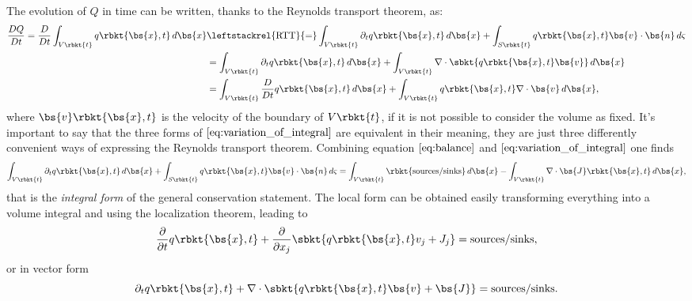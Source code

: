The evolution of $Q$ in time can be written, thanks to the Reynolds transport theorem, as:
\begin{subequations}\label{eq:variation_of_integral}
    \begin{align}
        \dfrac{DQ}{Dt} = \dfrac{D}{Dt}\int_{V\rbkt{t}}q\rbkt{\bs{x},t}\,d\bs{x} 
        &\leftstackrel{\text{RTT}}{=} \int_{V\rbkt{t}} \partial_{t}q\rbkt{\bs{x},t}\,d\bs{x} + \int_{S\rbkt{t}} q\rbkt{\bs{x},t}\bs{v}\cdot\bs{n} \,d\varsigma\\
        & = \int_{V\rbkt{t}} \partial_{t}q\rbkt{\bs{x},t}\,d\bs{x} + \int_{V\rbkt{t}} \nabla\cdot\sbkt{q\rbkt{\bs{x},t}\bs{v}}\,d\bs{x}\\
        & = \int_{V\rbkt{t}} \dfrac{D}{Dt}q\rbkt{\bs{x},t}\,d\bs{x} + \int_{V\rbkt{t}} q\rbkt{\bs{x},t}\nabla\cdot\bs{v}\,d\bs{x},
    \end{align}
\end{subequations}
where $\bs{v}\rbkt{\bs{x},t}$ is the velocity of the boundary of $V\rbkt{t}$, if it is not possible to consider the volume as fixed. It's important to say that the three forms of $\eqref{eq:variation_of_integral}$ are equivalent in their meaning, they are just three differently convenient ways of expressing the Reynolds transport theorem. Combining equation $\eqref{eq:balance}$ and $\eqref{eq:variation_of_integral}$ one finds
\begin{equation}\label{eq:integral_conservation_statement}
    \int_{V\rbkt{t}} \partial_{t}q\rbkt{\bs{x},t}\,d\bs{x} + \int_{S\rbkt{t}} q\rbkt{\bs{x},t}\bs{v}\cdot\bs{n} \,d\varsigma =\int_{V\rbkt{t}} \rbkt{\text{sources/sinks}}\,d\bs{x} - \int_{V\rbkt{t}} \nabla\cdot \bs{J}\rbkt{\bs{x},t} \,d\bs{x},
\end{equation}
that is the \emph{integral form} of the general conservation statement. The local form can be obtained easily transforming everything into a volume integral and using the localization theorem, leading to
\begin{equation}
    \dfrac{\partial}{\partial t}q\rbkt{\bs{x},t} + \dfrac{\partial}{\partial x_{j}}\sbkt{q\rbkt{\bs{x},t}v_{j} + J_{j} } = \text{sources/sinks},
\end{equation}
or in vector form
\begin{equation}\label{eq:differential_conservation_statement}
    \partial_{t}q\rbkt{\bs{x},t} + \nabla\cdot\sbkt{q\rbkt{\bs{x},t}\bs{v} + \bs{J} } = \text{sources/sinks}.
\end{equation}
